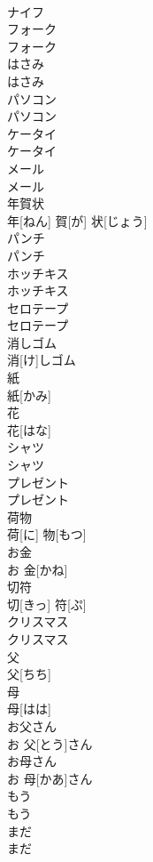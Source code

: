 \documentclass[8pt]{extreport}
\begin{document}
\begin{CJK}{UTF8}{min}
\\	ナイフ		
\\	フォーク	
\\	フォーク		
\\	はさみ	
\\	はさみ		
\\	パソコン	
\\	パソコン		
\\	ケータイ	
\\	ケータイ		
\\	メール	
\\	メール		
\\	年賀状	
\\	年[ねん] 賀[が] 状[じょう]		
\\	パンチ	
\\	パンチ		
\\	ホッチキス	
\\	ホッチキス		
\\	セロテープ	
\\	セロテープ		
\\	消しゴム	
\\	消[け]しゴム		
\\	紙	
\\	紙[かみ]		
\\	花	
\\	花[はな]		
\\	シャツ	
\\	シャツ		
\\	プレゼント	
\\	プレゼント		
\\	荷物	
\\	荷[に] 物[もつ]		
\\	お金	
\\	お 金[かね]		
\\	切符	
\\	切[きっ] 符[ぷ]		
\\	クリスマス	
\\	クリスマス		
\\	父	
\\	父[ちち]		
\\	母	
\\	母[はは]		
\\	お父さん	
\\	お 父[とう]さん		
\\	お母さん	
\\	お 母[かあ]さん		
\\	もう	
\\	もう		
\\	まだ	
\\	まだ		

\end{CJK}
\end{document}
